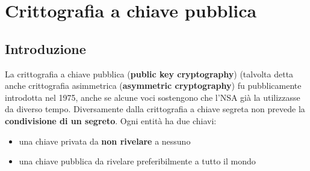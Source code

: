 \chapter{Crittografia a chiave pubblica} \label{ch:publickey}
\section{Introduzione}
La crittografia a chiave pubblica (\textbf{public key cryptography}) (talvolta detta anche crittografia asimmetrica (\textbf{asymmetric cryptography}) fu pubblicamente introdotta nel 1975, anche se alcune voci sostengono che l'NSA già la utilizzasse da diverso tempo. Diversamente dalla crittografia a chiave segreta non prevede la \textbf{condivisione di un segreto}. Ogni entità ha due chiavi:

\begin{itemize}
	\item una chiave privata da \textbf{non rivelare} a nessuno
	\item una chiave pubblica da rivelare preferibilmente a tutto il mondo
\end{itemize}

